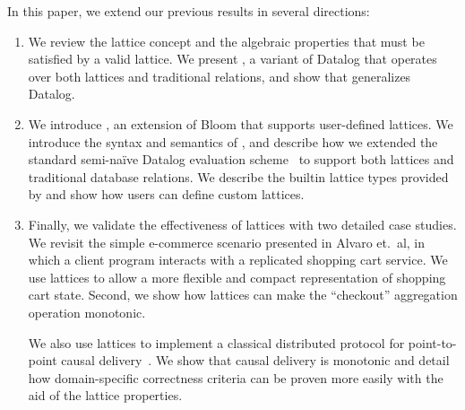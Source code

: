 In this paper, we extend our previous results in several directions:
\begin{enumerate}
\item
  We review the lattice concept and the algebraic properties that must be
  satisfied by a valid lattice. We present \baselang, a variant of Datalog that
  operates over both lattices and traditional relations, and show that \baselang
  generalizes Datalog.

\item
  We introduce \lang, an extension of Bloom that supports user-defined
  lattices. We introduce the syntax and semantics of \lang, and describe how we
  extended the standard semi-na\"{i}ve Datalog evaluation
  scheme~\cite{Balbin1987} to support both lattices and traditional database
  relations. We describe the builtin lattice types provided by \lang and show
  how users can define custom lattices.

\item
  Finally, we validate the effectiveness of lattices with two detailed case
  studies. We revisit the simple e-commerce scenario presented in Alvaro et.\
  al, in which a client program interacts with a replicated shopping cart
  service. We use lattices to allow a more flexible and compact representation
  of shopping cart state. Second, we show how lattices can make the ``checkout''
  aggregation operation monotonic.

  We also use lattices to implement a classical distributed protocol for
  point-to-point causal delivery~\cite{Schiper1989}. We show that causal
  delivery is monotonic and detail how domain-specific correctness criteria can
  be proven more easily with the aid of the lattice properties.
\end{enumerate}

